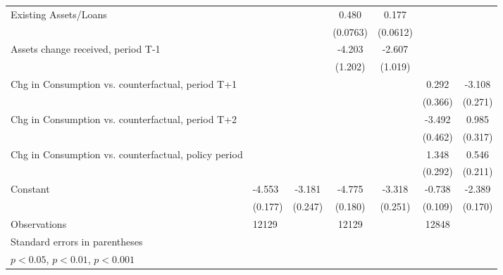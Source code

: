 \begin{table}[htbp]
\begin{tabular}{p{0.8in}l*{5}{c}}
Existing Assets/Loans&                     &                     &       0.480\sym{***}&       0.177\sym{**} &                     &                     \\
                    &                     &                     &    (0.0763)         &    (0.0612)         &                     &                     \\
Assets change received, period T-1&                     &                     &      -4.203\sym{***}&      -2.607\sym{*}  &                     &                     \\
                    &                     &                     &     (1.202)         &     (1.019)         &                     &                     \\
Chg in Consumption vs. counterfactual, period T+1&                     &                     &                     &                     &       0.292         &      -3.108\sym{***}\\
                    &                     &                     &                     &                     &     (0.366)         &     (0.271)         \\
Chg in Consumption vs. counterfactual, period T+2&                     &                     &                     &                     &      -3.492\sym{***}&       0.985\sym{**} \\
                    &                     &                     &                     &                     &     (0.462)         &     (0.317)         \\
Chg in Consumption vs. counterfactual, policy period&                     &                     &                     &                     &       1.348\sym{***}&       0.546\sym{**} \\
                    &                     &                     &                     &                     &     (0.292)         &     (0.211)         \\
Constant            &      -4.553\sym{***}&      -3.181\sym{***}&      -4.775\sym{***}&      -3.318\sym{***}&      -0.738\sym{***}&      -2.389\sym{***}\\
                    &     (0.177)         &     (0.247)         &     (0.180)         &     (0.251)         &     (0.109)         &     (0.170)         \\
\hline
Observations        &       12129         &                     &       12129         &                     &       12848         &                     \\
\hline\hline
\multicolumn{7}{l}{\footnotesize Standard errors in parentheses}\\
\multicolumn{7}{l}{\footnotesize \sym{*} \(p<0.05\), \sym{**} \(p<0.01\), \sym{***} \(p<0.001\)}\\
\end{tabular}
\end{table}
